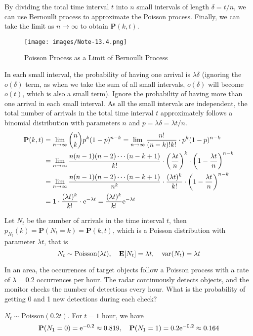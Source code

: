 By dividing the total time interval $t$ into $n$ small intervals of length $\delta = t/n$, we can use Bernoulli process to approximate the Poisson process. Finally, we can take the limit as $n \to \infty$ to obtain $\mathbf{P}(k, t)$.
\begin{figure}[H]
    \centering
    \texttt{[image: images/Note-13.4.png]}
    \caption{Poisson Process as a Limit of Bernoulli Process}
\end{figure}

In each small interval, the probability of having one arrival is $\lambda \delta$ (ignoring the $o(\delta)$ term, as when we take the sum of all small intervals, $o(\delta)$ will become $o(t)$, which is also a small term). Ignore the probability of having more than one arrival in each small interval.
As all the small intervals are independent, the total number of arrivals in the total time interval $t$ approximately follows a binomial distribution with parameters $n$ and $p = \lambda \delta = \lambda t/n$. 
\begin{equation}
\begin{aligned}
    \mathbf{P}(k, t) &= \lim_{n \to \infty} \binom{n}{k} p^k (1-p)^{n-k} = \lim_{n \to \infty} \frac{n!}{(n-k)! k!} \cdot p^k (1-p)^{n-k} \\
    &= \lim_{n \to \infty} \frac{n(n-1)(n-2)\cdots(n-k+1)}{k!} \cdot \qty(\frac{\lambda t}{n})^k \cdot \qty(1 - \frac{\lambda t}{n})^{n-k} \\
    &= \lim_{n \to \infty} \frac{n(n-1)(n-2)\cdots(n-k+1)}{n^k} \cdot \frac{(\lambda t)^k}{k!} \cdot \qty(1 - \frac{\lambda t}{n})^{n-k} \\\
    &= 1 \cdot \frac{(\lambda t)^k}{k!} \cdot \mathrm{e}^{-\lambda t} = \frac{(\lambda t)^k}{k!} \mathrm{e}^{-\lambda t}
\end{aligned}
\end{equation}

Let $N_t$ be the number of arrivals in the time interval $t$, then $p_{N_t}(k) = \mathbf{P}(N_t = k) = \mathbf{P}(k, t)$, which is a Poisson distribution with parameter $\lambda t$, that is
\begin{equation}
    N_t \sim \text{Poisson}(\lambda t), \quad \mathbf{E}[N_t] = \lambda t, \quad \mathrm{var}(N_t) = \lambda t
\end{equation}
\begin{example}
    In an area, the occurrences of target objects follow a Poisson process with a rate of $\lambda = 0.2$ occurrences per hour. The radar continuously detects objects, and the monitor checks the number of detections every hour. What is the probability of getting 0 and 1 new detections during each check?
\end{example}
\begin{solution}
    $N_t \sim \text{Poisson}(0.2t)$. For $t = 1$ hour, we have
    \begin{equation}
        \mathbf{P}(N_1 = 0) = \mathrm{e}^{-0.2} \approx 0.819, \quad \mathbf{P}(N_1 = 1) = 0.2 \mathrm{e}^{-0.2} \approx 0.164
    \end{equation}
\end{solution}


